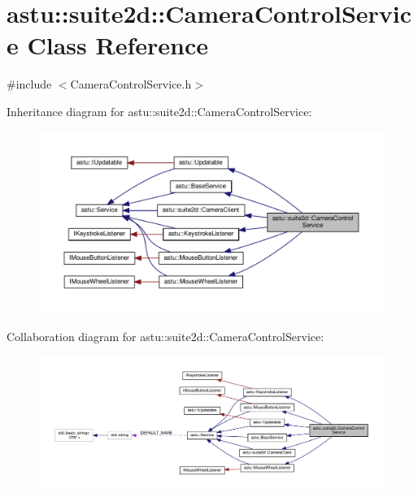 \hypertarget{classastu_1_1suite2d_1_1CameraControlService}{}\section{astu\+:\+:suite2d\+:\+:Camera\+Control\+Service Class Reference}
\label{classastu_1_1suite2d_1_1CameraControlService}


{\ttfamily \#include $<$Camera\+Control\+Service.\+h$>$}



Inheritance diagram for astu\+:\+:suite2d\+:\+:Camera\+Control\+Service\+:\nopagebreak
\begin{figure}[H]
\begin{center}
\leavevmode
\includegraphics[width=350pt]{classastu_1_1suite2d_1_1CameraControlService__inherit__graph}
\end{center}
\end{figure}


Collaboration diagram for astu\+:\+:suite2d\+:\+:Camera\+Control\+Service\+:\nopagebreak
\begin{figure}[H]
\begin{center}
\leavevmode
\includegraphics[width=350pt]{classastu_1_1suite2d_1_1CameraControlService__coll__graph}
\end{center}
\end{figure}
